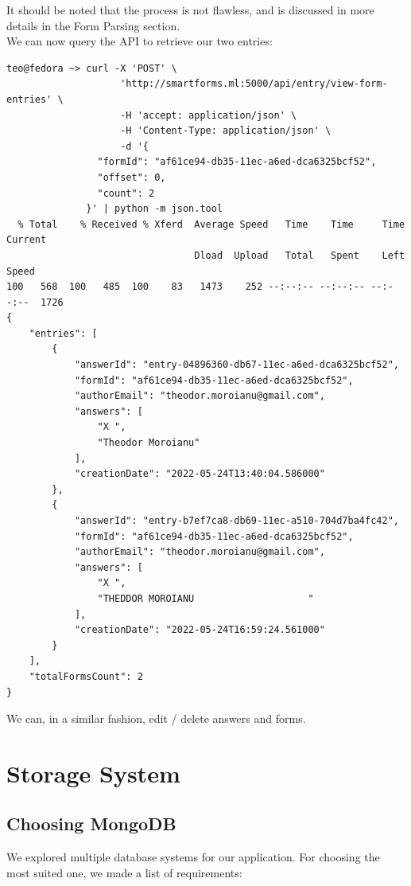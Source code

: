 \documentclass[12pt, a4paper]{report}
\begin{document}
It should be noted that the process is not flawless, and is discussed in more details in the Form Parsing section.
\\


We can now query the API to retrieve our two entries:

\begin{verbatim}
teo@fedora ~> curl -X 'POST' \
                    'http://smartforms.ml:5000/api/entry/view-form-entries' \
                    -H 'accept: application/json' \
                    -H 'Content-Type: application/json' \
                    -d '{
                "formId": "af61ce94-db35-11ec-a6ed-dca6325bcf52",
                "offset": 0,
                "count": 2
              }' | python -m json.tool
  % Total    % Received % Xferd  Average Speed   Time    Time     Time  Current
                                 Dload  Upload   Total   Spent    Left  Speed
100   568  100   485  100    83   1473    252 --:--:-- --:--:-- --:--:--  1726
{
    "entries": [
        {
            "answerId": "entry-04896360-db67-11ec-a6ed-dca6325bcf52",
            "formId": "af61ce94-db35-11ec-a6ed-dca6325bcf52",
            "authorEmail": "theodor.moroianu@gmail.com",
            "answers": [
                "X ",
                "Theodor Moroianu"
            ],
            "creationDate": "2022-05-24T13:40:04.586000"
        },
        {
            "answerId": "entry-b7ef7ca8-db69-11ec-a510-704d7ba4fc42",
            "formId": "af61ce94-db35-11ec-a6ed-dca6325bcf52",
            "authorEmail": "theodor.moroianu@gmail.com",
            "answers": [
                "X ",
                "THEDDOR MOROIANU                    "
            ],
            "creationDate": "2022-05-24T16:59:24.561000"
        }
    ],
    "totalFormsCount": 2
}
\end{verbatim}

We can, in a similar fashion, edit / delete answers and forms.


\chapter{Storage System}

\section{Choosing MongoDB}
We explored multiple database systems for our application. For choosing the most suited one, we made a list of requirements:
\end{document}
